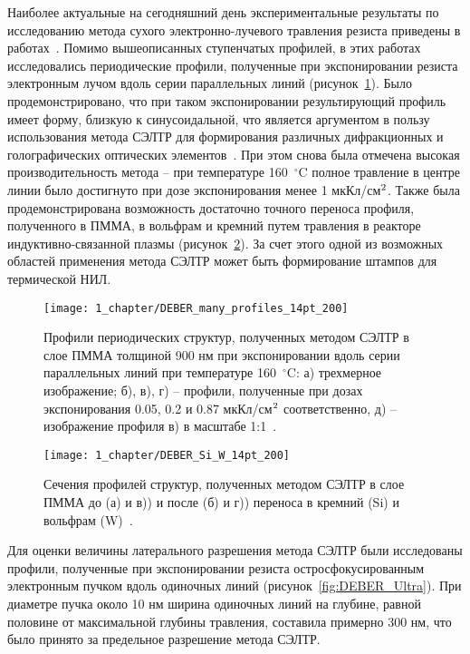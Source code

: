 Наиболее актуальные на сегодняшний день экспериментальные результаты по исследованию метода сухого электронно-лучевого травления резиста приведены в работах~\cite{Bruk_2015_co, Bruk_2016_mee}. Помимо вышеописанных ступенчатых профилей, в этих работах исследовались периодические профили, полученные при экспонировании резиста электронным лучом вдоль серии параллельных линий (рисунок~\ref{fig:DEBER_many_profiles}). Было продемонстрировано, что при таком экспонировании результирующий профиль имеет форму, близкую к синусоидальной, что является аргументом в пользу использования метода СЭЛТР для формирования различных дифракционных и голографических оптических элементов~\cite{Mitreska_sin_gratings}. При этом снова была отмечена высокая производительность метода -- при температуре 160~$^\circ$C полное травление в центре линии было достигнуто при дозе экспонирования менее 1 мкКл/см$^\text{2}$. Также была продемонстрирована возможность достаточно точного переноса профиля, полученного в ПММА, в вольфрам и кремний путем травления в реакторе индуктивно-связанной плазмы (рисунок~\ref{fig:DEBER_Si_W}). За счет этого одной из возможных областей применения метода СЭЛТР может быть формирование штампов для термической НИЛ.

\begin{figure}
	\centering
	\texttt{[image: 1\_chapter/DEBER\_many\_profiles\_14pt\_200]}
	\vspace{0.2em}
	\caption{Профили периодических структур, полученных методом СЭЛТР в слое ПММА толщиной 900 нм при экспонировании вдоль серии параллельных линий при температуре 160~$^\circ$C: а) трехмерное изображение; б), в), г) -- профили, полученные при дозах экспонирования 0.05, 0.2 и 0.87 мкКл/см$^\text{2}$ соответственно, д) -- изображение профиля в) в масштабе 1:1~\cite{Bruk_2016_mee}.}
	\label{fig:DEBER_many_profiles}
\end{figure}

\begin{figure}[t]
	\centering
	\texttt{[image: 1\_chapter/DEBER\_Si\_W\_14pt\_200]}
	\vspace{0.2em}
	\caption{Сечения профилей структур, полученных методом СЭЛТР в слое ПММА до (а) и в)) и после (б) и г)) переноса в кремний (Si) и вольфрам (W)~\cite{Bruk_2016_mee}.}
	\label{fig:DEBER_Si_W}
\end{figure}

Для оценки величины латерального разрешения метода СЭЛТР были исследованы профили, полученные при экспонировании резиста остросфокусированным электронным пучком вдоль одиночных линий (рисунок~\ref{fig:DEBER_Ultra}). При диаметре пучка около 10 нм ширина одиночных линий на глубине, равной половине от максимальной глубины травления, составила примерно 300 нм, что было принято за предельное разрешение метода СЭЛТР.

